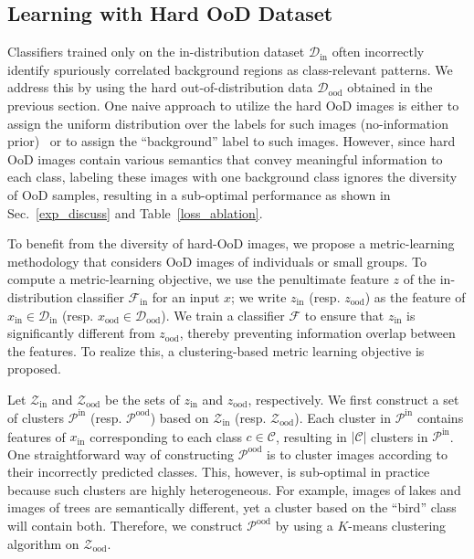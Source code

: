 \documentclass[10pt,twocolumn,letterpaper]{article}
\begin{document}
\subsection{Learning with Hard OoD Dataset}\label{method_proposed}
Classifiers trained only on the in-distribution dataset $\mathcal{D}_\text{in}$ often incorrectly identify spuriously correlated background regions as class-relevant patterns.
We address this by using the hard out-of-distribution data $\mathcal{D}_{\text{ood}}$ obtained in the previous section. 
One naive approach to utilize the hard OoD images is either to assign the uniform distribution over the labels for such images (no-information prior)~\cite{hendrycks2018deep, lee2017training, lee2021removing} or to assign the ``background'' label to such images.
However, since hard OoD images contain various semantics that convey meaningful information to each class, labeling these images with one background class ignores the diversity of OoD samples, resulting in a sub-optimal performance as shown in Sec.~\ref{exp_discuss} and Table~\ref{loss_ablation}.


To benefit from the diversity of hard-OoD images, we propose a metric-learning methodology that considers OoD images of individuals or small groups.
To compute a metric-learning objective, we use the penultimate feature $z$ of the in-distribution classifier $\mathcal{F}_\text{in}$ for an input $x$; we write $z_\text{in}$ (resp. $z_\text{ood}$) as the feature of $x_\text{in} \in \mathcal{D}_\text{in}$ (resp. $x_\text{ood} \in \mathcal{D}_\text{ood}$).
We train a classifier $\mathcal{F}$ to ensure that $z_\text{in}$ is significantly different from $z_\text{ood}$, thereby preventing information overlap between the features.
To realize this, a clustering-based metric learning objective is proposed. 


 
Let $\mathcal{Z}_\text{in}$ and $\mathcal{Z}_\text{ood}$ be the sets of $z_\text{in}$ and $z_\text{ood}$, respectively.
We first construct a set of clusters $\mathcal{P}^\text{in}$ (resp. $\mathcal{P}^\text{ood}$) based on $\mathcal{Z}_\text{in}$ (resp. $\mathcal{Z}_\text{ood}$). 
Each cluster in $\mathcal{P}^\text{in}$ contains features of $x_\text{in}$ corresponding to each class $c\in\mathcal{C}$, resulting in $|\mathcal{C}|$ clusters in $\mathcal{P}^\text{in}$.
One straightforward way of constructing $\mathcal{P}^\text{ood}$ is to cluster images according to their incorrectly predicted classes.
This, however, is sub-optimal in practice because such clusters are highly heterogeneous. For example, images of lakes and images of trees are semantically different, yet a cluster based on the ``bird'' class will contain both. 
Therefore, we construct $\mathcal{P}^\text{ood}$ by using a $K$-means clustering algorithm on $\mathcal{Z}_\text{ood}$.
\end{document}
